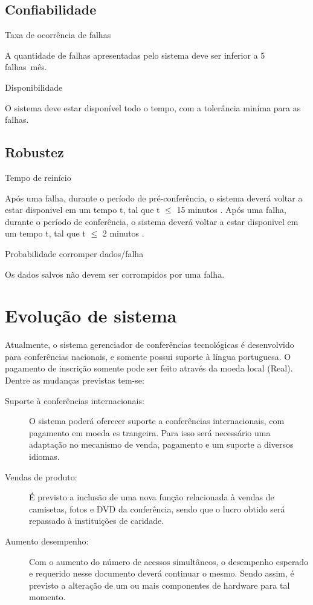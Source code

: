 \documentclass[letter]{article}
\begin{document}
\subsection{Confiabilidade}
\textbullet\hspace{1mm} Taxa de ocorrência de falhas

A quantidade de falhas apresentadas pelo sistema deve ser inferior a 5 falhas\ mês.

\textbullet\hspace{1mm} Disponibilidade

O sistema deve estar disponível todo o tempo, com a tolerância miníma para as falhas.


\subsection{Robustez}
\textbullet\hspace{1mm} Tempo de reinício

Após uma falha, durante o período de pré-conferência, o sistema deverá voltar a estar disponivel em um tempo t, tal que t $\leq$ 15 minutos .
Após uma falha, durante o período de conferência, o sistema deverá voltar a estar disponivel em um tempo t, tal que t $\leq$ 2 minutos .

\textbullet\hspace{1mm} Probabilidade corromper dados/falha

Os dados salvos não devem ser corrompidos por uma falha.


\section{Evolução de sistema}
Atualmente, o sistema gerenciador de conferências tecnológicas é desenvolvido para conferências nacionais, e somente possui suporte à língua portuguesa. O pagamento de inscrição somente pode ser feito através da moeda local (Real).
Dentre as mudanças previstas tem-se:

\begin{description}

\item[Suporte à conferências internacionais:]  O sistema poderá oferecer suporte a conferências internacionais, com pagamento em moeda es trangeira. Para isso será necessário uma adaptação no mecanismo de venda, pagamento e um suporte a diversos idiomas.

\item[Vendas de produto:]  É previsto a inclusão de uma nova função relacionada à vendas de camisetas, fotos e DVD da conferência, sendo que o lucro obtido será repassado à instituições de caridade.

\item[Aumento desempenho:]  Com o aumento do número de acessos simultâneos, o desempenho esperado e requerido nesse documento deverá continuar o mesmo. Sendo assim, é previsto a alteração de um ou mais componentes de hardware para tal momento. 
\end{description}
\end{document}
